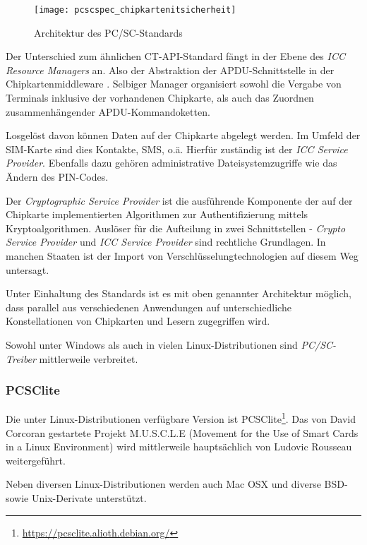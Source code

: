  \begin{figure}[htp]
  \begin{center}
   \texttt{[image: pcscspec\_chipkartenitsicherheit]}
  \end{center}
  \caption[Architektur des PC/SC-Standards]{Architektur des PC/SC-Standards \cite{spitz11}}
  \label{abb:architektur_pcsc}
 \end{figure}

Der Unterschied zum ähnlichen CT-API-Standard fängt in der Ebene
des \textit{ICC Resource Managers} an. Also der Abstraktion der
APDU-Schnittstelle in der Chipkartenmiddleware \cite{spitz11}.
Selbiger Manager organisiert sowohl die Vergabe von Terminals inklusive
der vorhandenen Chipkarte, als auch das Zuordnen zusammenhängender
APDU-Kommandoketten.

Losgelöst davon können Daten auf der Chipkarte abgelegt werden. Im Umfeld
der SIM-Karte sind dies Kontakte, SMS, o.ä. Hierfür zuständig ist der
\textit{ICC Service Provider}. Ebenfalls dazu gehören administrative Dateisystemzugriffe
wie das Ändern des PIN-Codes.

Der \textit{Cryptographic Service Provider} ist die ausführende Komponente
der auf der Chipkarte implementierten Algorithmen zur Authentifizierung mittels
Kryptoalgorithmen. Auslöser für die Aufteilung in zwei Schnittstellen -
\textit{Crypto Service Provider} und \textit{ICC Service Provider} sind
rechtliche Grundlagen. In manchen Staaten ist der Import von
Verschlüsselungtechnologien auf diesem Weg untersagt.

Unter Einhaltung des Standards ist es mit oben genannter Architektur möglich,
dass parallel aus verschiedenen Anwendungen auf unterschiedliche Konstellationen
von Chipkarten und Lesern zugegriffen wird.

Sowohl unter Windows als auch in vielen Linux-Distributionen sind
\textit{PC/SC-Treiber} mittlerweile verbreitet.

\subsubsection{PCSClite}
Die unter Linux-Distributionen verfügbare Version ist
PCSClite\footnote{\url{https://pcsclite.alioth.debian.org/}}.
Das von David Corcoran gestartete Projekt M.U.S.C.L.E
(Movement for the Use of Smart Cards in a Linux Environment)
wird mittlerweile hauptsächlich von Ludovic Rousseau
weitergeführt\cite{pcscliteweb}.

Neben diversen Linux-Distributionen werden auch Mac OSX und diverse
BSD- sowie Unix-Derivate unterstützt.

